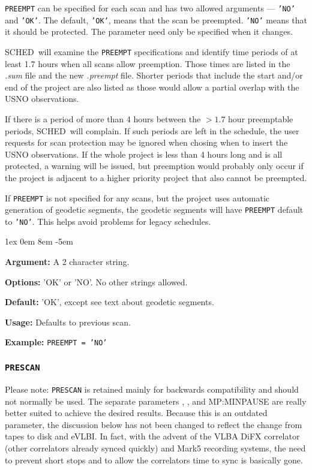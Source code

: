 \documentclass{report}
\newcommand{\schedb}{{\sc SCHED~}}
\newcommand{\rcwbox}[5]{
  \begin{list}{}{\parsep 1ex  \itemsep 0em
                 \leftmargin 8em  \itemindent -5em }
    \item {\bf Argument:} #1
    \item {\bf Options:}  #2
    \item {\bf Default:}  #3
    \item {\bf Usage:}    #4
    \item {\bf Example:}  #5
  \end{list}
}
\begin{document}
{\tt PREEMPT} can be specified for each scan and has two allowed
arguments --- {\tt 'NO'} and {\tt 'OK'}.  The default, {\tt 'OK'},
means that the scan be preempted.  {\tt 'NO'} means that it should
be protected.  The parameter need only be specified when it changes.

\schedb will examine the {\tt PREEMPT} specifications and identify
time periods of at least 1.7 hours when all scans allow preemption.
Those times are listed in the {\sl .sum} file and the new {\sl .preempt}
file.  Shorter periods that include the start and/or end of the project
are also listed as those would allow a partial overlap with the USNO
observations.

If there is a period of more than 4 hours between the $>1.7$ hour
preemptable periods, \schedb will complain.  If such periods are left
in the schedule, the user requests for scan protection may be ignored
when chosing when to insert the USNO observations.  If the whole project
is less than 4 hours long and is all protected, a warning will be
issued, but preemption would probably only occur if the project is
adjacent to a higher priority project that also cannot be preempted.

If {\tt PREEMPT} is not specified for any scans, but the project
uses automatic generation of geodetic segments, the geodetic segments
will have {\tt PREEMPT} default to {\tt 'NO'}.  This helps avoid
problems for legacy schedules.

\rcwbox
{A 2 character string.}
{'OK' or 'NO'.  No other strings allowed.}
{'OK', except see text about geodetic segments.}
{Defaults to previous scan.}
{{\tt PREEMPT = 'NO'}}


\subsubsection{\label{MP:PRESCAN}{\tt PRESCAN}}

Please note: {\tt PRESCAN} is retained mainly for backwards
compatibility and should not normally be used.  The separate
parameters , , and  {MP:MINPAUSE}
are really better suited to achieve the desired results.  Because this
is an outdated parameter, the discussion below has not been changed to
reflect the change from tapes to disk and eVLBI.  In fact, with the
advent of the VLBA DiFX correlator (other correlators already synced
quickly) and Mark5 recording systems, the need to prevent short stops
and to allow the correlators time to sync is basically gone.
\end{document}
